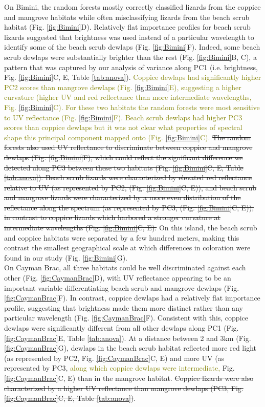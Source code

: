 On Bimini, the random forests mostly correctly classified lizards from the coppice and mangrove habitats while often misclassifying lizards from the beach scrub habitat (Fig. \ref{fig:Bimini}D). Relatively flat importance profiles for beach scrub lizards suggested that brightness was used instead of a particular wavelength to identify some of the beach scrub dewlaps (Fig. \ref{fig:Bimini}F). Indeed, some beach scrub dewlaps were substantially brighter than the rest (Fig. \ref{fig:Bimini}B, C), a pattern that was captured by our analysis of variance along PC1 (i.e. brightness, Fig. \ref{fig:Bimini}C, E, Table \ref{tab:anova}). \textcolor{olive}{Coppice dewlaps had significantly higher PC2 scores than mangrove dewlaps (Fig. \ref{fig:Bimini}E), suggesting a higher curvature (higher UV and red reflectance than more intermediate wavelengths, Fig. \ref{fig:Bimini}C). For these two habitats the random forests were most sensitive to UV reflectance (Fig. \ref{fig:Bimini}F). Beach scrub dewlaps had higher PC3 scores than coppice dewlaps but it was not clear what properties of spectral shape this principal component mapped onto (Fig. \ref{fig:Bimini}C).} \sout{The random forests also used UV reflectance to discriminate between coppice and mangrove dewlaps (Fig. \ref{fig:Bimini}F), which could reflect the significant difference we detected along PC3 between these two habitats (Fig. \ref{fig:Bimini}C, E, Table \ref{tab:anova}). Beach scrub lizards were characterized by elevated red reflectance relative to UV (as represented by PC2, (Fig. \ref{fig:Bimini}C, E)), and beach scrub and mangrove lizards were characterized by a more even distribution of the reflectance along the spectrum (as represented by PC3, (Fig. \ref{fig:Bimini}C, E)), in contrast to coppice lizards which harbored a stronger curvature at intermediate wavelengths (Fig. \ref{fig:Bimini}C, E).} On this island, the beach scrub and coppice habitats were separated by a few hundred meters, making this contrast the smallest geographical scale at which differences in coloration were found in our study (Fig. \ref{fig:Bimini}G).\\

On Cayman Brac, all three habitats could be well discriminated against each other (Fig. \ref{fig:CaymanBrac}D), with UV reflectance appearing to be an important variable differentiating beach scrub and mangrove dewlaps (Fig. \ref{fig:CaymanBrac}F). In contrast, coppice dewlaps had a relatively flat importance profile, suggesting that brightness made them more distinct rather than any particular wavelength (Fig. \ref{fig:CaymanBrac}F). Consistent with this, coppice dewlaps were significantly different from all other dewlaps along PC1 (Fig. \ref{fig:CaymanBrac}E, Table \ref{tab:anova}). At a distance between 2 and 3km (Fig. \ref{fig:CaymanBrac}G), dewlaps in the beach scrub habitat reflected more red light (as represented by PC2, Fig. \ref{fig:CaymanBrac}C, E) and more UV (as represented by PC3, \textcolor{olive}{along which coppice dewlaps were intermediate,} Fig. \ref{fig:CaymanBrac}C, E) than in the mangrove habitat. \sout{Coppice lizards were also characterized by a higher UV reflectance than mangrove dewlaps (PC3, Fig. \ref{fig:CaymanBrac}C, E, Table \ref{tab:anova})}.\\

